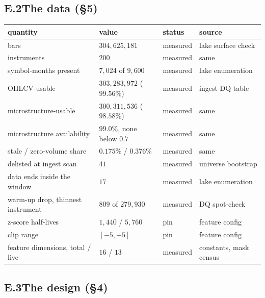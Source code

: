 \subsection*{E.2\quad The data (\S5)}

\begin{center}
\small
\begin{tabularx}{\linewidth}{lllX}
\toprule
quantity & value & status & source \\
\midrule
bars & $304{,}625{,}181$ & measured & lake surface check \\
instruments & $200$ & measured & same \\
symbol-months present & $7{,}024$ of $9{,}600$ & measured & lake enumeration \\
OHLCV-usable & $303{,}283{,}972$ ($99.56\%$) & measured & ingest DQ table \\
microstructure-usable & $300{,}311{,}536$ ($98.58\%$) & measured & same \\
microstructure availability & $99.0\%$, none below $0.7$ & measured & same \\
stale / zero-volume share & $0.175\%$ / $0.376\%$ & measured & same \\
delisted at ingest scan & $41$ & measured & universe bootstrap \\
data ends inside the window & $17$ & measured & lake enumeration \\
warm-up drop, thinnest instrument & $809$ of $279{,}930$ & measured & DQ spot-check \\
z-score half-lives & $1{,}440$ / $5{,}760$ & pin & feature config \\
clip range & $[-5, +5]$ & pin & feature config \\
feature dimensions, total / live & $16$ / $13$ & measured & constants, mask census \\
\bottomrule
\end{tabularx}
\end{center}

\subsection*{E.3\quad The design (\S4)}

